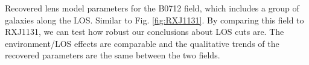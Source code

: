 \label{fig:B0712} Recovered lens model parameters for the B0712 field, which includes a group of galaxies along the LOS. Similar to Fig. \ref{fig:RXJ1131}. By comparing this field to RXJ1131, we can test how robust our conclusions about LOS cuts are. The environment/LOS effects are comparable and the qualitative trends of the recovered parameters are the same between the two fields.